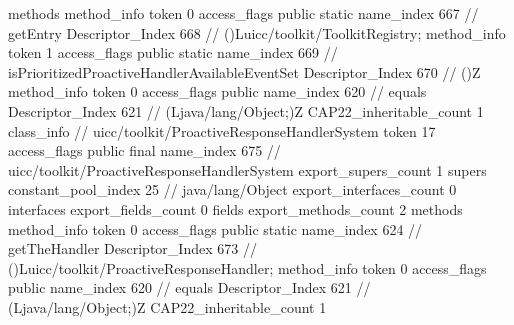 {{{			methods {
				method_info {
					token	0
					access_flags	public static
					name_index	667		// getEntry
					Descriptor_Index	668		// ()Luicc/toolkit/ToolkitRegistry;
				}
				method_info {
					token	1
					access_flags	public static
					name_index	669		// isPrioritizedProactiveHandlerAvailableEventSet
					Descriptor_Index	670		// ()Z
				}
				method_info {
					token	0
					access_flags	public
					name_index	620		// equals
					Descriptor_Index	621		// (Ljava/lang/Object;)Z
				}
			}
			CAP22_inheritable_count	1
		}
		class_info {		// uicc/toolkit/ProactiveResponseHandlerSystem
			token	17
			access_flags	public final
			name_index	675		// uicc/toolkit/ProactiveResponseHandlerSystem
			export_supers_count	1
			supers {
				constant_pool_index	25		// java/lang/Object
			}
			export_interfaces_count	0
			interfaces {
			}
			export_fields_count	0
			fields {
			}
			export_methods_count	2
			methods {
				method_info {
					token	0
					access_flags	public static
					name_index	624		// getTheHandler
					Descriptor_Index	673		// ()Luicc/toolkit/ProactiveResponseHandler;
				}
				method_info {
					token	0
					access_flags	public
					name_index	620		// equals
					Descriptor_Index	621		// (Ljava/lang/Object;)Z
				}
			}
			CAP22_inheritable_count	1
		}
	}
}

